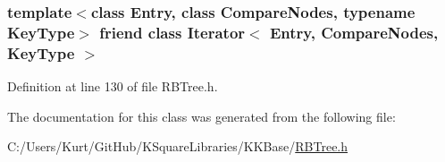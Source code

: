 \subsubsection[{\texorpdfstring{Iterator$<$ Entry, Compare\+Nodes, Key\+Type $>$}{Iterator< Entry, CompareNodes, KeyType >}}]{\setlength{\rightskip}{0pt plus 5cm}template$<$class Entry, class Compare\+Nodes, typename Key\+Type$>$ friend class {\bf Iterator}$<$ Entry, Compare\+Nodes, Key\+Type $>$\hspace{0.3cm}{\ttfamily [friend]}}\hypertarget{class_k_k_b_1_1_r_b_tree_a6acff2e7675519aa68e26d0e3328ac78}{}\label{class_k_k_b_1_1_r_b_tree_a6acff2e7675519aa68e26d0e3328ac78}


Definition at line 130 of file R\+B\+Tree.\+h.



The documentation for this class was generated from the following file\+:\begin{DoxyCompactItemize}
\item 
C\+:/\+Users/\+Kurt/\+Git\+Hub/\+K\+Square\+Libraries/\+K\+K\+Base/\hyperlink{_r_b_tree_8h}{R\+B\+Tree.\+h}\end{DoxyCompactItemize}
